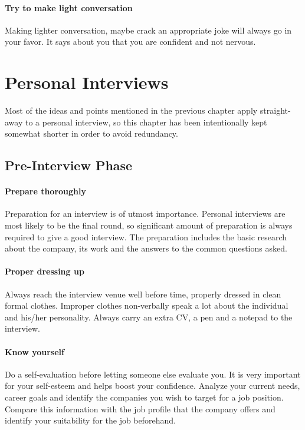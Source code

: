 \documentclass[a4paper,12pt]{report}
\begin{document}
\subsubsection{Try to make light conversation}
Making lighter conversation, maybe crack an appropriate joke will always go in your favor. It says about you
that you are confident and not nervous.

\chapter{Personal Interviews}
Most of the ideas and points mentioned in the previous chapter apply straight-away to a personal interview, so this chapter
has been intentionally kept somewhat shorter in order to avoid redundancy.

\section{Pre-Interview Phase}
\subsubsection{Prepare thoroughly}
Preparation for an interview is of utmost importance. Personal interviews are most likely to be the final round,
so significant amount of preparation is always required to give a good interview. The preparation includes the 
basic research about the company, its work and the answers to the common questions asked.
\subsubsection{Proper dressing up}
Always reach the interview venue well before time, properly dressed in clean formal clothes. Improper clothes
non-verbally speak a lot about the individual and his/her personality. Always carry an extra CV, a pen and 
a notepad to the interview.
\subsubsection{Know yourself}
Do a self-evaluation before letting someone else evaluate you. It is very important for your self-esteem and helps
boost your confidence. Analyze your current needs, career goals and identify the companies you wish to target for 
a job position. Compare this information with the job profile that the company offers and identify your suitability
for the job beforehand.
\end{document}

